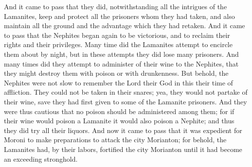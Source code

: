 \bverse \iffalse And it came to pass that they did, notwithstanding all the intrigues of the Lamanites, keep and protect all the prisoners whom they had taken, and also maintain all the ground and the advantage which they had retaken. \fi
And it came to pass that they did, notwithstanding all the intrigues of the Lamanites, keep and protect all the prisoners whom they had taken, and also maintain all the ground and the advantage which they had retaken.
\bverse \iffalse And it came to pass that the Nephites began again to be victorious, and to reclaim their rights and their privileges. \fi
And it came to pass that the Nephites began again to be victorious, and to reclaim their rights and their privileges.
\bverse \iffalse Many time did the Lamanites attempt to encircle them about by night, but in these attempts they did lose many prisoners. \fi
Many time did the Lamanites attempt to encircle them about by night, but in these attempts they did lose many prisoners.
\bverse \iffalse And many times did they attempt to administer of their wine to the Nephites, that they might destroy them with poison or with drunkenness. \fi
And many times did they attempt to administer of their wine to the Nephites, that they might destroy them with poison or with drunkenness.
\bverse \iffalse But behold, the Nephites were not slow to remember the Lord their God in this their time of affliction. They could not be taken in their snares; yea, they would not partake of their wine, save they had first given to some of the Lamanite prisoners. \fi
But behold, the Nephites were not slow to remember the Lord their God in this their time of affliction. They could not be taken in their snares; yea, they would not partake of their wine, save they had first given to some of the Lamanite prisoners.
\bverse \iffalse And they were thus cautious that no poison should be administered among them; for if their wine would poison a Lamanite it would also poison a Nephite; and thus they did try all their liquors. \fi
And they were thus cautious that no poison should be administered among them; for if their wine would poison a Lamanite it would also poison a Nephite; and thus they did try all their liquors.
\bverse \iffalse And now it came to pass that it was expedient for Moroni to make preparations to attack the city Morianton; for behold, the Lamanites had, by their labors, fortified the city Morianton until it had become an exceeding stronghold. \fi
And now it came to pass that it was expedient for Moroni to make preparations to attack the city Morianton; for behold, the Lamanites had, by their labors, fortified the city Morianton until it had become an exceeding stronghold.
